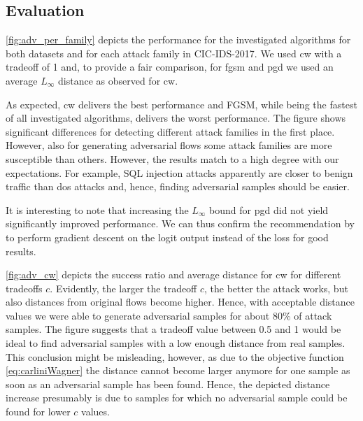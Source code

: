 \documentclass[conference]{IEEEtran}
\begin{document}
\subsection{Evaluation}
\autoref{fig:adv_per_family} depicts the performance for the investigated algorithms for both datasets and for each attack family in CIC-IDS-2017.
We used \gls{cw} with a tradeoff of 1 and, to provide a fair comparison, for \gls{fgsm} and \gls{pgd} we used an average $L_\infty$ distance as observed for \gls{cw}.

As expected, \gls{cw}  delivers the best performance and FGSM, while being the fastest of all investigated algorithms, delivers the worst performance.
The figure shows significant differences for detecting different attack families in the first place. However, also for generating adversarial flows some attack families are more susceptible than others. However, the results match to a high degree with our expectations. For example, SQL injection attacks apparently are closer to benign traffic than \gls{dos} attacks and, hence, finding adversarial samples should be easier.

It is interesting to note that increasing the $L_\infty$ bound for \gls{pgd} did not yield significantly improved performance. We can thus confirm the recommendation by \cite{carlini_towards_2017} to perform gradient descent on the logit output instead of the loss for good results.

\autoref{fig:adv_cw} depicts the success ratio and average distance for \gls{cw} for different tradeoffs $c$.
Evidently, the larger the tradeoff $c$, the better the attack works, but also distances from original flows become higher.
Hence, with acceptable distance values we were able to generate adversarial samples for about 80\% of attack samples.
The figure suggests that a tradeoff value between 0.5 and 1 would be ideal to find adversarial samples with a low enough distance from real samples.
This conclusion might be misleading, however, as due to the objective function \eqref{eq:carliniWagner} the distance cannot become larger anymore for one sample as soon as an adversarial sample has been found. %
Hence, the depicted distance increase presumably is due to samples for which no adversarial sample could be found for lower $c$ values.
\end{document}
